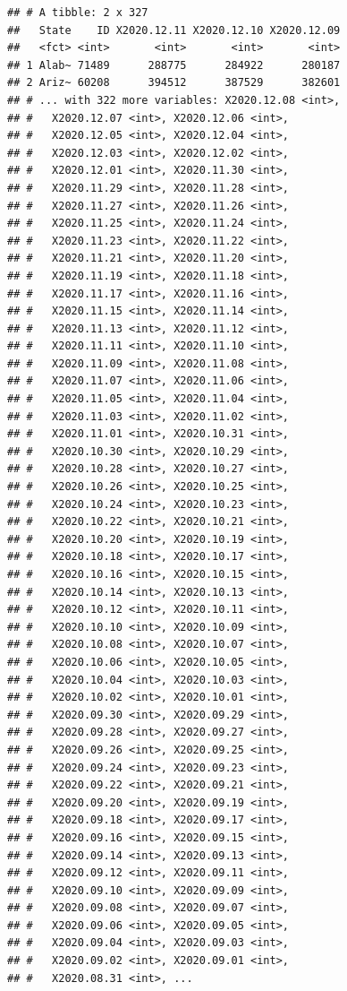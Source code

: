 \documentclass[]{book}
\begin{document}
\begin{verbatim}
## # A tibble: 2 x 327
##   State    ID X2020.12.11 X2020.12.10 X2020.12.09
##   <fct> <int>       <int>       <int>       <int>
## 1 Alab~ 71489      288775      284922      280187
## 2 Ariz~ 60208      394512      387529      382601
## # ... with 322 more variables: X2020.12.08 <int>,
## #   X2020.12.07 <int>, X2020.12.06 <int>,
## #   X2020.12.05 <int>, X2020.12.04 <int>,
## #   X2020.12.03 <int>, X2020.12.02 <int>,
## #   X2020.12.01 <int>, X2020.11.30 <int>,
## #   X2020.11.29 <int>, X2020.11.28 <int>,
## #   X2020.11.27 <int>, X2020.11.26 <int>,
## #   X2020.11.25 <int>, X2020.11.24 <int>,
## #   X2020.11.23 <int>, X2020.11.22 <int>,
## #   X2020.11.21 <int>, X2020.11.20 <int>,
## #   X2020.11.19 <int>, X2020.11.18 <int>,
## #   X2020.11.17 <int>, X2020.11.16 <int>,
## #   X2020.11.15 <int>, X2020.11.14 <int>,
## #   X2020.11.13 <int>, X2020.11.12 <int>,
## #   X2020.11.11 <int>, X2020.11.10 <int>,
## #   X2020.11.09 <int>, X2020.11.08 <int>,
## #   X2020.11.07 <int>, X2020.11.06 <int>,
## #   X2020.11.05 <int>, X2020.11.04 <int>,
## #   X2020.11.03 <int>, X2020.11.02 <int>,
## #   X2020.11.01 <int>, X2020.10.31 <int>,
## #   X2020.10.30 <int>, X2020.10.29 <int>,
## #   X2020.10.28 <int>, X2020.10.27 <int>,
## #   X2020.10.26 <int>, X2020.10.25 <int>,
## #   X2020.10.24 <int>, X2020.10.23 <int>,
## #   X2020.10.22 <int>, X2020.10.21 <int>,
## #   X2020.10.20 <int>, X2020.10.19 <int>,
## #   X2020.10.18 <int>, X2020.10.17 <int>,
## #   X2020.10.16 <int>, X2020.10.15 <int>,
## #   X2020.10.14 <int>, X2020.10.13 <int>,
## #   X2020.10.12 <int>, X2020.10.11 <int>,
## #   X2020.10.10 <int>, X2020.10.09 <int>,
## #   X2020.10.08 <int>, X2020.10.07 <int>,
## #   X2020.10.06 <int>, X2020.10.05 <int>,
## #   X2020.10.04 <int>, X2020.10.03 <int>,
## #   X2020.10.02 <int>, X2020.10.01 <int>,
## #   X2020.09.30 <int>, X2020.09.29 <int>,
## #   X2020.09.28 <int>, X2020.09.27 <int>,
## #   X2020.09.26 <int>, X2020.09.25 <int>,
## #   X2020.09.24 <int>, X2020.09.23 <int>,
## #   X2020.09.22 <int>, X2020.09.21 <int>,
## #   X2020.09.20 <int>, X2020.09.19 <int>,
## #   X2020.09.18 <int>, X2020.09.17 <int>,
## #   X2020.09.16 <int>, X2020.09.15 <int>,
## #   X2020.09.14 <int>, X2020.09.13 <int>,
## #   X2020.09.12 <int>, X2020.09.11 <int>,
## #   X2020.09.10 <int>, X2020.09.09 <int>,
## #   X2020.09.08 <int>, X2020.09.07 <int>,
## #   X2020.09.06 <int>, X2020.09.05 <int>,
## #   X2020.09.04 <int>, X2020.09.03 <int>,
## #   X2020.09.02 <int>, X2020.09.01 <int>,
## #   X2020.08.31 <int>, ...
\end{verbatim}
\end{document}
